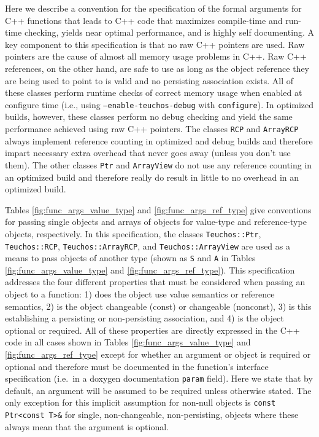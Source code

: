 Here we describe a convention for the specification of the formal arguments
for C++ functions that leads to C++ code that maximizes compile-time and
run-time checking, yields near optimal performance, and is highly self
documenting.  A key component to this specification is that no raw C++
pointers are used.  Raw pointers are the cause of almost all memory usage
problems in C++.  Raw C++ references, on the other hand, are safe to use as
long as the object reference they are being used to point to is valid and no
persisting association exists.  All of these classes perform runtime checks of
correct memory usage when enabled at configure time (i.e., using
{}\texttt{--enable-teuchos-debug} with {}\texttt{configure}).  In optimized
builds, however, these classes perform no debug checking and yield the same
performance achieved using raw C++ pointers.  The classes {}\texttt{RCP} and
{}\texttt{ArrayRCP} always implement reference counting in optimized and debug
builds and therefore impart necessary extra overhead that never goes away
(unless you don't use them).  The other classes {}\texttt{Ptr} and
{}\texttt{ArrayView} do not use any reference counting in an optimized build
and therefore really do result in little to no overhead in an optimized build.

Tables {}\ref{fig:func_args_value_type} and {}\ref{fig:func_args_ref_type}
give conventions for passing single objects and arrays of objects for
value-type {} and reference-type
{} objects, respectively.  In this specification,
the classes {}\texttt{Teuchos\-::Ptr}, {}\texttt{Teuchos\-::RCP},
{}\texttt{Teuchos\-::ArrayRCP}, and {}\texttt{Teuchos\-::ArrayView} are used
as a means to pass objects of another type (shown as {}\texttt{S} and
{}\texttt{A} in Tables {}\ref{fig:func_args_value_type} and
{}\ref{fig:func_args_ref_type}).  This specification addresses the four
different properties that must be considered when passing an object to a
function: 1) does the object use value semantics or reference semantics, 2) is
the object changeable (const) or changeable (nonconst), 3) is this
establishing a persisting or non-persisting association, and 4) is the object
optional or required.  All of these properties are directly expressed in the
C++ code in all cases shown in Tables {}\ref{fig:func_args_value_type} and
{}\ref{fig:func_args_ref_type} except for whether an argument or object is
required or optional and therefore must be documented in the function's
interface specification (i.e.\ in a doxygen documentation {}\texttt{param}
field).  Here we state that by default, an argument will be assumed to be
required unless otherwise stated.  The only exception for this implicit
assumption for non-null objects is {}\texttt{const Ptr<const T>\&} for single,
non-changeable, non-persisting, objects where these always mean that the
argument is optional.

